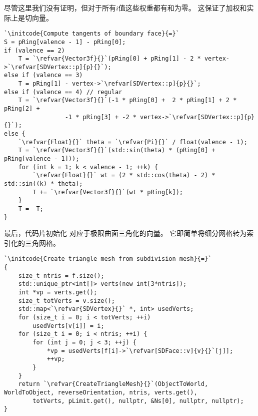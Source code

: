 尽管这里我们没有证明，但对于所有$i$值这些权重都有和为零。
这保证了加权和实际上是切向量。
\begin{lstlisting}
`\initcode{Compute tangents of boundary face}{=}`
S = pRing[valence - 1] - pRing[0];
if (valence == 2)
    T = `\refvar{Vector3f}{}`(pRing[0] + pRing[1] - 2 * vertex->`\refvar[SDVertex::p]{p}{}`);
else if (valence == 3)
    T = pRing[1] - vertex->`\refvar[SDVertex::p]{p}{}`;
else if (valence == 4) // regular
    T = `\refvar{Vector3f}{}`(-1 * pRing[0] +  2 * pRing[1] + 2 * pRing[2] + 
                 -1 * pRing[3] + -2 * vertex->`\refvar[SDVertex::p]{p}{}`);
else {
    `\refvar{Float}{}` theta = `\refvar{Pi}{}` / float(valence - 1);
    T = `\refvar{Vector3f}{}`(std::sin(theta) * (pRing[0] + pRing[valence - 1]));
    for (int k = 1; k < valence - 1; ++k) {
        `\refvar{Float}{}` wt = (2 * std::cos(theta) - 2) * std::sin((k) * theta);
        T += `\refvar{Vector3f}{}`(wt * pRing[k]);
    }
    T = -T;
}
\end{lstlisting}

最后，代码片初始化
对应于极限曲面三角化的向量。
它即简单将细分网格转为索引化的三角网格。
\begin{lstlisting}
`\initcode{Create triangle mesh from subdivision mesh}{=}`
{
    size_t ntris = f.size();
    std::unique_ptr<int[]> verts(new int[3*ntris]);
    int *vp = verts.get();
    size_t totVerts = v.size();
    std::map<`\refvar{SDVertex}{}` *, int> usedVerts;
    for (size_t i = 0; i < totVerts; ++i)
        usedVerts[v[i]] = i;
    for (size_t i = 0; i < ntris; ++i) {
        for (int j = 0; j < 3; ++j) {
            *vp = usedVerts[f[i]->`\refvar[SDFace::v]{v}{}`[j]];
            ++vp;
        }
    }
    return `\refvar{CreateTriangleMesh}{}`(ObjectToWorld, WorldToObject, reverseOrientation, ntris, verts.get(),
        totVerts, pLimit.get(), nullptr, &Ns[0], nullptr, nullptr);
}
\end{lstlisting}